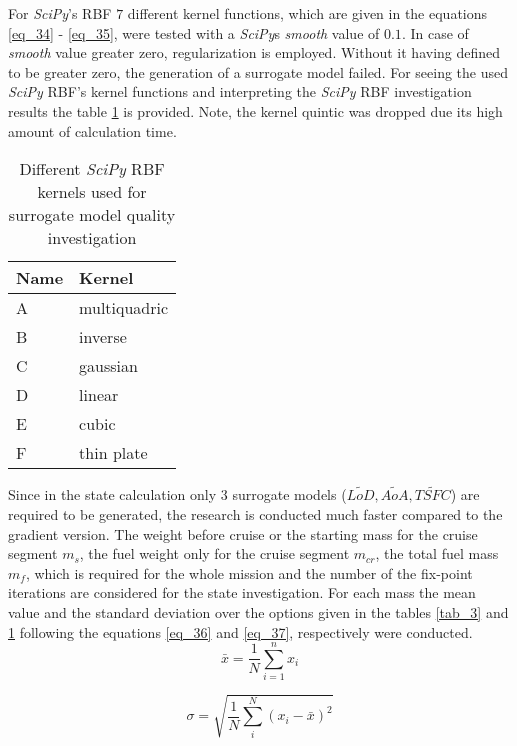 \FloatBarrier
For \emph{SciPy}'s RBF $7$ different 
kernel functions, which 
are given in the equations \eqref{eq_34} -
\eqref{eq_35}, were tested with 
a \emph{SciPy}s \emph{smooth} value of $0.1$. 
In case of \emph{smooth} value greater zero, 
regularization is employed. Without 
it having defined to be greater zero, 
the generation of a surrogate model failed.
For seeing the used \emph{SciPy} RBF's kernel functions and 
interpreting the \emph{SciPy} RBF investigation results the table 
\ref{tab_4} is provided. Note, the kernel 
quintic was dropped due its high amount of 
calculation time.
%
\begin{table}[!h]
        \centering
        \begin{tabular}{l l}
            \multicolumn{1}{p{2cm}}{\textbf{Name}} &
            \multicolumn{1}{p{2cm}}{\textbf{Kernel}}\\
            \hline
            A & multiquadric  \\
            B &  inverse \\
            C &  gaussian\\
            D &  linear\\
            E & cubic\\
            F &  thin plate\\
        \end{tabular}
        \caption{Different \emph{SciPy} RBF kernels used for surrogate model 
        quality investigation }
        \label{tab_4}
\end{table} 
%
\FloatBarrier
Since in the state 
calculation only 3 surrogate models ($\tilde{LoD}, 
\tilde{AoA},  \tilde{TSFC}$) are required to be 
generated, the research is conducted much faster 
compared to the gradient version. 
The weight 
before cruise or the starting mass for the cruise 
segment $m_s$, the fuel weight only 
for the cruise segment $m_{cr}$, the
total fuel mass $m_{f}$, which is required for the  
whole mission  and the number 
of the fix-point iterations are considered 
for the state investigation. For each mass 
the mean value and the standard deviation
over the 
options given 
in the tables \ref{tab_3} and \ref{tab_4}
following the equations \eqref{eq_36} and 
\eqref{eq_37}, respectively were conducted.
\begin{equation}
    \label{eq_36}
    \bar{x} = \frac{1}{N}\sum_{i=1}^{n}x_i
\end{equation}

\begin{equation}
    \label{eq_37}
    \sigma = \sqrt{\frac{1}{N} \sum_{i}^{N}(x_i - \bar{x})^{2}}
\end{equation}

